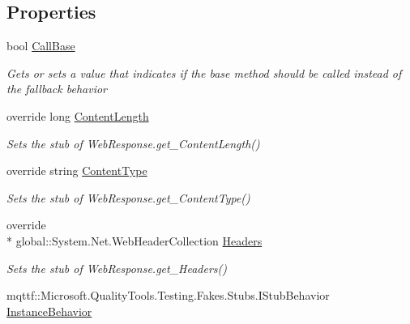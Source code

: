 \subsection*{Properties}
\begin{DoxyCompactItemize}
\item 
bool \hyperlink{class_system_1_1_net_1_1_fakes_1_1_stub_web_response_a8682bb42b2ed15b8f1678f1edc13713f}{Call\-Base}
\begin{DoxyCompactList}\small\item\em Gets or sets a value that indicates if the base method should be called instead of the fallback behavior\end{DoxyCompactList}\item 
override long \hyperlink{class_system_1_1_net_1_1_fakes_1_1_stub_web_response_a3942bf9d328579a4b16f1a66bea54103}{Content\-Length}
\begin{DoxyCompactList}\small\item\em Sets the stub of Web\-Response.\-get\-\_\-\-Content\-Length()\end{DoxyCompactList}\item 
override string \hyperlink{class_system_1_1_net_1_1_fakes_1_1_stub_web_response_ad4ba405aa10a84da985d59882b919ada}{Content\-Type}
\begin{DoxyCompactList}\small\item\em Sets the stub of Web\-Response.\-get\-\_\-\-Content\-Type()\end{DoxyCompactList}\item 
override \\*
global\-::\-System.\-Net.\-Web\-Header\-Collection \hyperlink{class_system_1_1_net_1_1_fakes_1_1_stub_web_response_ad79686007fec913c3a73690ed92b8788}{Headers}
\begin{DoxyCompactList}\small\item\em Sets the stub of Web\-Response.\-get\-\_\-\-Headers()\end{DoxyCompactList}\item 
mqttf\-::\-Microsoft.\-Quality\-Tools.\-Testing.\-Fakes.\-Stubs.\-I\-Stub\-Behavior \hyperlink{class_system_1_1_net_1_1_fakes_1_1_stub_web_response_ada63f67c0baf936c7862a471bd7e3c8e}{Instance\-Behavior}

\end{DoxyCompactItemize}
